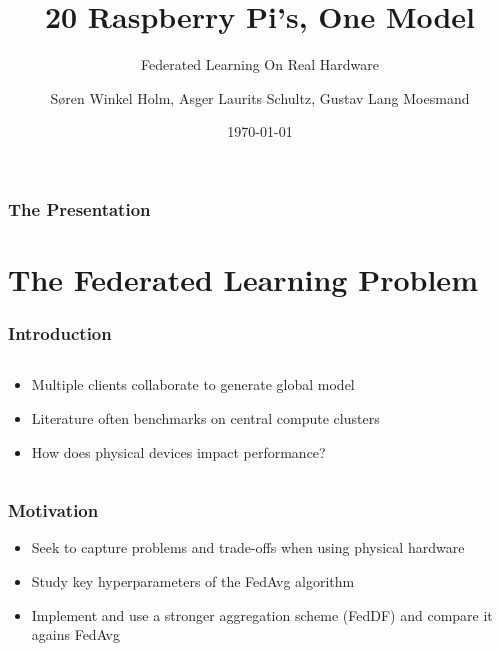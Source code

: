 \documentclass{beamer}
\title{20 Raspberry Pi's, One Model}
\subtitle{
    Federated Learning On Real Hardware
}
\author[Søren Holm, Asger Schultz, Gustav Moesmand]
{Søren Winkel Holm, Asger Laurits Schultz, Gustav Lang Moesmand}
\institute[DTU]{Technical University of Denmark}
\date{\today}
\begin{document}
\begin{frame}
    \titlepage
\end{frame}

\begin{frame}
    \frametitle{The Presentation}
    \footnotesize
    \tableofcontents
\end{frame}

\section{The Federated Learning Problem}
\begin{frame}
	\frametitle{Introduction}
	\noindent
	\begin{columns}
		\begin{column}{.5\textwidth}
			\begin{itemize}
				\item Multiple clients collaborate to generate global model
				\item Literature often benchmarks on central compute clusters
				\item How does physical devices impact performance?
			\end{itemize}
		\end{column}
		\begin{column}{.5\textwidth}
			\begin{figure}
    				\centering
				\scalebox{.6}{}
			\end{figure}
		\end{column}
	\end{columns}
\end{frame}

\begin{frame}
	\frametitle{Motivation}
			\begin{itemize}
				\item Seek to capture problems and trade-offs when using physical hardware
				\item Study key hyperparameters of the FedAvg algorithm
				\item Implement and use a stronger aggregation scheme (FedDF) and compare it agains FedAvg
			\end{itemize}
\end{frame}
\end{document}
